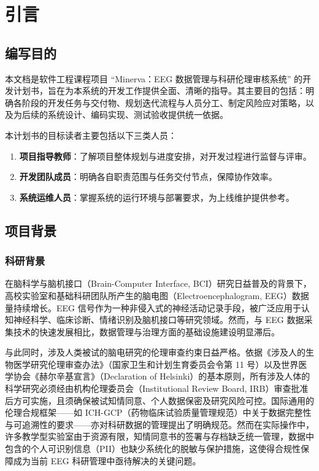 \section{引言}

\subsection{编写目的}

本文档是软件工程课程项目 ``Minerva：EEG 数据管理与科研伦理审核系统'' 的开发计划书，旨在为本系统的开发工作提供全面、清晰的指导。其主要目的包括：明确各阶段的开发任务与交付物、规划迭代流程与人员分工、制定风险应对策略，以及为后续的系统设计、编码实现、测试验收提供统一依据。

本计划书的目标读者主要包括以下三类人员：

\begin{enumerate}
  \item \textbf{项目指导教师}：了解项目整体规划与进度安排，对开发过程进行监督与评审。
  \item \textbf{开发团队成员}：明确各自职责范围与任务交付节点，保障协作效率。
  \item \textbf{系统运维人员}：掌握系统的运行环境与部署要求，为上线维护提供参考。
\end{enumerate}

\subsection{项目背景}

\subsubsection{科研背景}

在脑科学与脑机接口（Brain-Computer Interface, BCI）研究日益普及的背景下，高校实验室和基础科研团队所产生的脑电图（Electroencephalogram, EEG）数据量持续增长。EEG 信号作为一种非侵入式的神经活动记录手段，被广泛应用于认知神经科学、临床诊断、情绪识别及脑机接口等研究领域。然而，与 EEG 数据采集技术的快速发展相比，数据管理与治理方面的基础设施建设明显滞后。

与此同时，涉及人类被试的脑电研究的伦理审查约束日益严格。依据《涉及人的生物医学研究伦理审查办法》（国家卫生和计划生育委员会令第 11 号）以及世界医学协会《赫尔辛基宣言》（Declaration of Helsinki）的基本原则，所有涉及人体的科学研究必须经由机构伦理委员会（Institutional Review Board, IRB）审查批准后方可实施，且须确保被试知情同意、个人数据保密及研究风险可控。国际通用的伦理合规框架——如 ICH-GCP（药物临床试验质量管理规范）中关于数据完整性与可追溯性的要求——亦对科研数据的管理提出了明确规范。然而在实际操作中，许多教学型实验室由于资源有限，知情同意书的签署与存档缺乏统一管理，数据中包含的个人可识别信息（PII）也缺少系统化的脱敏与保护措施，这使得合规性保障成为当前 EEG 科研管理中亟待解决的关键问题。


